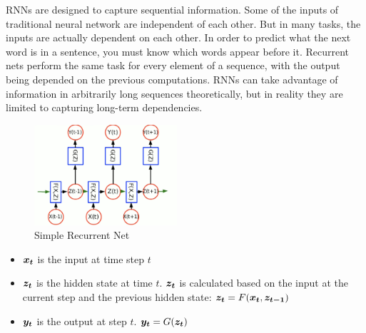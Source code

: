 RNNs are designed to capture sequential information.
Some of the inputs of traditional neural network are independent of each other.
But in many tasks, the inputs are actually dependent on each other.
In order to predict what the next word is in a sentence, you must know which words appear before it.
Recurrent nets perform the same task for every element of a sequence, with the output being depended on the previous computations. 
RNNs can take advantage of information in arbitrarily long sequences theoretically, but in reality they are limited to capturing long-term dependencies.

\begin{figure}[h]
    \centering
    \includegraphics[width=150pt]{figs/rnn.png}
    \caption{Simple Recurrent Net}
    \label{fig:Simple RNN}
\end{figure}

\begin{itemize}
  \item $\vect{x_{t}}$ is the input at time step $t$
  \item $\vect{z_{t}}$ is the hidden state at time $t$. $\vect{z_{t}}$ is calculated based on the input at the current step and the previous hidden state:
  $\vect{z_t} = F(\vect{x_t}, \vect{z_{t-1}})$
  \item $\vect{y_t}$ is the output at step $t$. $\vect{y_t} = G(\vect{z_t})$
\end{itemize}




